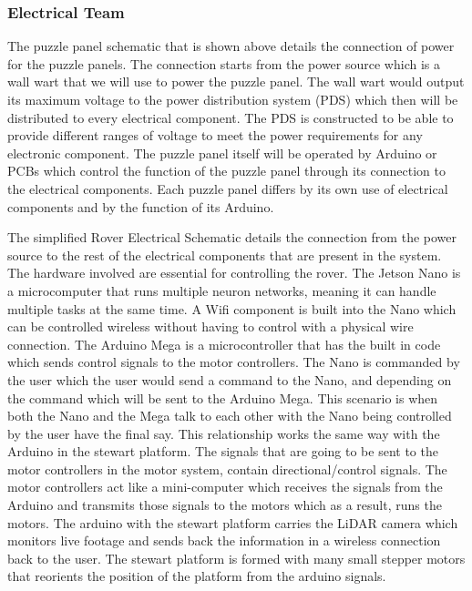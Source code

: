 \documentclass[a4paper, 10pt]{article}
\begin{document}
	\subsubsection{Electrical Team}
	
The puzzle panel schematic that is shown above details the connection of power for the puzzle panels. The connection starts from the power source which is a wall wart that we will use to power the puzzle panel. The wall wart would output its maximum voltage to the power distribution system (PDS) which then will be distributed to every electrical component. The PDS is constructed to be able to provide different ranges of voltage to meet the power requirements for any electronic component. The puzzle panel itself will be operated by Arduino or PCBs which control the function of the puzzle panel through its connection to the electrical components. Each puzzle panel differs by its own use of electrical components and by the function of its Arduino. 
	
	The simplified Rover Electrical Schematic details the connection from the power source to the rest of the electrical components that are present in the system. The hardware involved are essential for controlling the rover. The Jetson Nano is a microcomputer that runs multiple neuron networks, meaning it can handle multiple tasks at the same time. A Wifi component is built into the Nano which can be controlled wireless without having to control with a physical wire connection. The Arduino Mega is a microcontroller that has the built in code which sends control signals to the motor controllers. The Nano is commanded by the user which the user would send a command to the Nano, and depending on the command which will be sent to the Arduino Mega. This scenario is when both the Nano and the Mega talk to each other with the Nano being controlled by the user have the final say. This relationship works the same way with the Arduino in the stewart platform. The signals that are going to be sent to the motor controllers in the motor system, contain directional/control signals. The motor controllers act like a mini-computer which receives the signals from the Arduino and transmits those signals to the motors which as a result, runs the motors. The arduino with the stewart platform carries the LiDAR camera which monitors live footage and sends back the information in a wireless connection back to the user. The stewart platform is formed with many small stepper motors that reorients the position of the platform from the arduino signals.  
\end{document}
